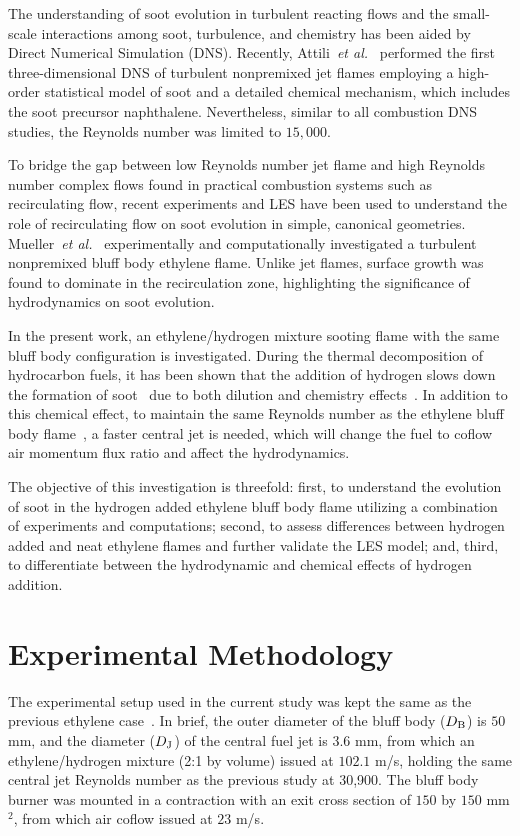 \documentclass{essci}
\begin{document}
The understanding of soot evolution in turbulent reacting flows and the small-scale interactions among soot, turbulence, and chemistry has been aided by Direct Numerical Simulation (DNS).  Recently, Attili~\emph{et al.}~\cite{attili14} performed the first three-dimensional DNS of turbulent nonpremixed jet flames employing a high-order statistical model of soot and a detailed chemical mechanism, which includes the soot precursor naphthalene.  Nevertheless, similar to all combustion DNS studies, the Reynolds number was limited to $15,000$.

To bridge the gap between low Reynolds number jet flame and high Reynolds number complex flows found in practical combustion systems such as recirculating flow, recent experiments and LES have been used to understand the role of recirculating flow on soot evolution in simple, canonical geometries.  Mueller~\emph{et al.}~\cite{mueller13} experimentally and computationally investigated a turbulent nonpremixed bluff body ethylene flame.  Unlike jet flames, surface growth was found to dominate in the recirculation zone, highlighting the significance of hydrodynamics on soot evolution.

In the present work, an ethylene/hydrogen mixture sooting flame with the same bluff body configuration is investigated.  During the thermal decomposition of hydrocarbon fuels, it has been shown that the addition of hydrogen slows down the formation of soot~\cite{tesner58} due to both dilution and chemistry effects~\cite{dearden68,du95,gulder96,guo06,zhao14}.  In addition to this chemical effect, to maintain the same Reynolds number as the ethylene bluff body flame~\cite{mueller13}, a faster central jet is needed, which will change the fuel to coflow air momentum flux ratio and affect the hydrodynamics.

The objective of this investigation is threefold: first, to understand the evolution of soot in the hydrogen added ethylene bluff body flame utilizing a combination of experiments and computations; second, to assess differences between hydrogen added and neat ethylene flames and further validate the LES model; and, third, to differentiate between the hydrodynamic and chemical effects of hydrogen addition.

\section{Experimental Methodology}

The experimental setup used in the current study was kept the same as the previous ethylene case~\cite{mueller13}.  In brief, the outer diameter of the bluff body ($D_{\rm B}$) is $50$ mm, and the diameter ($D_{\rm J}$) of the central fuel jet is $3.6$ mm, from which an ethylene/hydrogen mixture (2:1 by volume) issued at $102.1$ m/s, holding the same central jet Reynolds number as the previous study at 30,900.  The bluff body burner was mounted in a contraction with an exit cross section of $150$ by $150$ mm$^2$, from which air coflow issued at $23$ m/s.  
\end{document}
